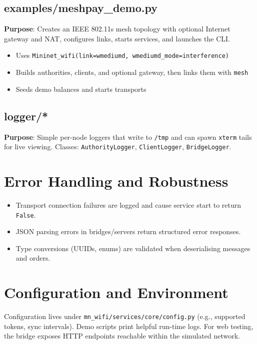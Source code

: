 \documentclass[11pt,a4paper]{article}
\begin{document}
\subsection{examples/meshpay\_demo.py}
\textbf{Purpose}: Creates an IEEE 802.11s mesh topology with optional Internet gateway and NAT, configures links, starts services, and launches the CLI.
\begin{itemize}[noitemsep]
  \item Uses \texttt{Mininet\_wifi(link=wmediumd, wmediumd\_mode=interference)}
  \item Builds authorities, clients, and optional gateway, then links them with \texttt{mesh}
  \item Seeds demo balances and starts transports
\end{itemize}

\subsection{logger/*}
\textbf{Purpose}: Simple per-node loggers that write to \texttt{/tmp} and can spawn \texttt{xterm} tails for live viewing. Classes: \texttt{AuthorityLogger}, \texttt{ClientLogger}, \texttt{BridgeLogger}.

\section{Error Handling and Robustness}
\begin{itemize}[noitemsep]
  \item Transport connection failures are logged and cause service start to return \texttt{False}.
  \item JSON parsing errors in bridges/servers return structured error responses.
  \item Type conversions (UUIDs, enums) are validated when deserialising messages and orders.
\end{itemize}

\section{Configuration and Environment}
Configuration lives under \texttt{mn\_wifi/services/core/config.py} (e.g., supported tokens, sync intervals). Demo scripts print helpful run-time logs. For web testing, the bridge exposes HTTP endpoints reachable within the simulated network.
\end{document}
